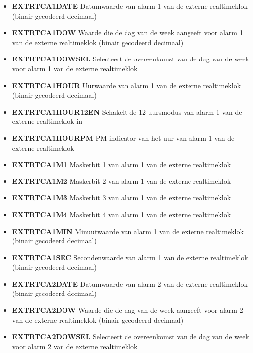 \begin{itemize}
\item{\bf{EXTRTCA1DATE}} Datumwaarde van alarm 1 van de externe realtimeklok (binair gecodeerd decimaal)
\item{\bf{EXTRTCA1DOW}} Waarde die de dag van de week aangeeft voor alarm 1 van de externe realtimeklok (binair gecodeerd decimaal)
\item{\bf{EXTRTCA1DOWSEL}} Selecteert de overeenkomst van de dag van de week voor alarm 1 van de externe realtimeklok
\item{\bf{EXTRTCA1HOUR}} Uurwaarde van alarm 1 van de externe realtimeklok (binair gecodeerd decimaal)
\item{\bf{EXTRTCA1HOUR12EN}} Schakelt de 12-uursmodus van alarm 1 van de externe realtimeklok in
\item{\bf{EXTRTCA1HOURPM}} PM-indicator van het uur van alarm 1 van de externe realtimeklok
\item{\bf{EXTRTCA1M1}} Maskerbit 1 van alarm 1 van de externe realtimeklok
\item{\bf{EXTRTCA1M2}} Maskerbit 2 van alarm 1 van de externe realtimeklok
\item{\bf{EXTRTCA1M3}} Maskerbit 3 van alarm 1 van de externe realtimeklok
\item{\bf{EXTRTCA1M4}} Maskerbit 4 van alarm 1 van de externe realtimeklok
\item{\bf{EXTRTCA1MIN}} Minuutwaarde van alarm 1 van de externe realtimeklok (binair gecodeerd decimaal)
\item{\bf{EXTRTCA1SEC}} Secondenwaarde van alarm 1 van de externe realtimeklok (binair gecodeerd decimaal)
\item{\bf{EXTRTCA2DATE}} Datumwaarde van alarm 2 van de externe realtimeklok (binair gecodeerd decimaal)
\item{\bf{EXTRTCA2DOW}} Waarde die de dag van de week aangeeft voor alarm 2 van de externe realtimeklok (binair gecodeerd decimaal)
\item{\bf{EXTRTCA2DOWSEL}} Selecteert de overeenkomst van de dag van de week voor alarm 2 van de externe realtimeklok

\end{itemize}
